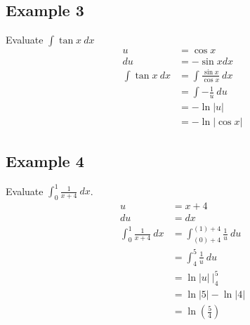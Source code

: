 \documentclass{article}
\theoremstyle{mytheoremstyle}
\theoremstyle{mytheoremstyle}
\theoremstyle{myproblemstyle}
\begin{document}
    \subsection*{Example 3}
    Evaluate $\int \tan x \ dx$
    \begin{align*}
        u &= \cos x \\
        du &= -\sin x dx \\
        \int \tan x \ dx
        &= \int \frac{\sin x}{\cos x} \ dx \\
        &= \int -\frac{1}{u} \ du \\
        &= -\ln |u| \\
        &= -\ln |\cos x|
    \end{align*}

    \subsection*{Example 4}
    Evaluate $\int_{0}^{1} \frac{1}{x+4} \ dx$.
    \begin{align*}
        u &= x+4 \\
        du &= dx \\
        \int_{0}^{1} \frac{1}{x+4} \ dx
        &= \int_{(0)+4}^{(1)+4} \frac{1}{u} \ du \\
        &= \int_{4}^{5} \frac{1}{u} \ du \\
        &= \ln|u| \ \Big|_{4}^{5} \\
        &= \ln|5| - \ln|4| \\
        &= \ln(\frac{5}{4})
    \end{align*}
\end{document}
